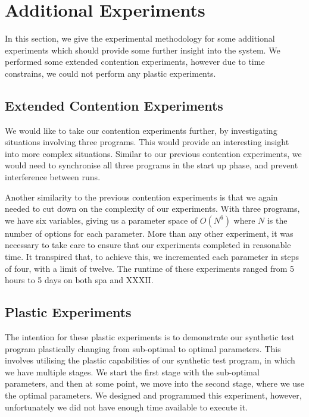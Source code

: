 \section{Additional Experiments}
\label{section:experimental_methodology:additional_experiments}

In this section, we give the experimental methodology for some additional experiments which should provide some further insight into the system. We performed some extended contention experiments, however due to time constrains, we could not perform any plastic experiments.



\subsection{Extended Contention Experiments}
\label{section:experimental_methodology:extended_contention_experiments}

We would like to take our contention experiments further, by investigating situations involving three programs. This would provide an interesting insight into more complex situations. Similar to our previous contention experiments, we would need to synchronise all three programs in the start up phase, and prevent interference between runs. 

Another similarity to the previous contention experiments is that we again needed to cut down on the complexity of our experiments. With three programs, we have six variables, giving us a parameter space of $O(N^6)$ where $N$ is the number of options for each parameter. More than any other experiment, it was necessary to take care to ensure that our experiments completed in reasonable time. It transpired that, to achieve this, we incremented each parameter in steps of four, with a limit of twelve. The runtime of these experiments ranged from 5 hours to 5 days on both spa and XXXII.



\subsection{Plastic Experiments}
\label{section:experimental_methodology:plastic_experiment}

The intention for these plastic experiments is to demonstrate our synthetic test program plastically changing from sub-optimal to optimal parameters. This involves utilising the plastic capabilities of our synthetic test program, in which we have multiple stages. We start the first stage with the sub-optimal parameters, and then at some point, we move into the second stage, where we use the optimal parameters. We designed and programmed this experiment, however, unfortunately we did not have enough time available to execute it.



